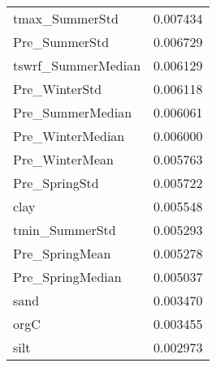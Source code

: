 \begin{tabular}{lr}
tmax_SummerStd & 0.007434 \\
Pre_SummerStd & 0.006729 \\
tswrf_SummerMedian & 0.006129 \\
Pre_WinterStd & 0.006118 \\
Pre_SummerMedian & 0.006061 \\
Pre_WinterMedian & 0.006000 \\
Pre_WinterMean & 0.005763 \\
Pre_SpringStd & 0.005722 \\
clay & 0.005548 \\
tmin_SummerStd & 0.005293 \\
Pre_SpringMean & 0.005278 \\
Pre_SpringMedian & 0.005037 \\
sand & 0.003470 \\
orgC & 0.003455 \\
silt & 0.002973 \\
\bottomrule
\end{tabular}
